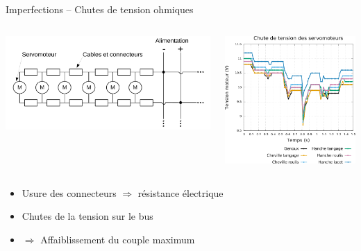 
\begin{frame}[noframenumbering]{}
\end{frame}

\begin{frame}[noframenumbering]{Imperfections -- Chutes de tension ohmiques}
    \begin{columns}
        \begin{column}{0.5\linewidth}
            \centering
            \includegraphics[type=pdf,ext=.pdf,read=.pdf,width=1.0\linewidth]{../schema/electric_bus}
        \end{column}
        \begin{column}{0.5\linewidth}
            \centering
            \includegraphics[type=pdf,ext=.pdf,read=.pdf,width=1.0\linewidth]{../plot/motors_voltage}
        \end{column}
    \end{columns}
    \begin{itemize}
        \item Usure des connecteurs $\Rightarrow$ résistance électrique
        \item Chutes de la tension sur le bus
        \item $\Rightarrow$ Affaiblissement du couple maximum
    \end{itemize}
\end{frame}

